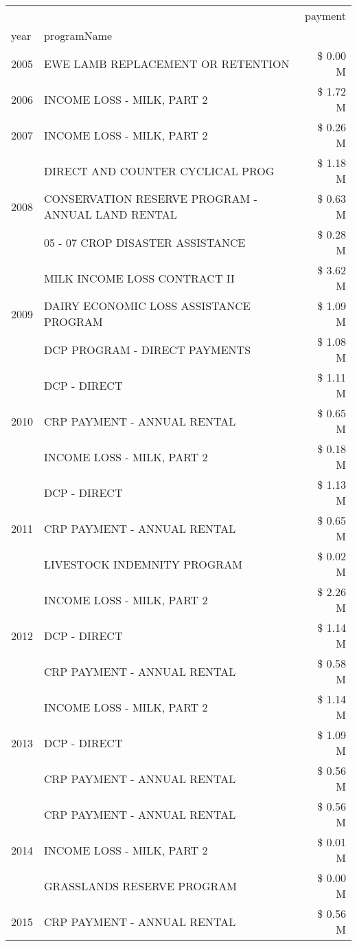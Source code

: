 \begin{tabular}{llr}
\toprule
 &  & payment \\
year & programName &  \\
\midrule
2005 & EWE LAMB REPLACEMENT OR RETENTION & \$ 0.00 M \\
\cline{1-3}
2006 & INCOME LOSS - MILK, PART 2 & \$ 1.72 M \\
\cline{1-3}
2007 & INCOME LOSS - MILK, PART 2 & \$ 0.26 M \\
\cline{1-3}
\multirow[t]{3}{*}{2008} & DIRECT AND COUNTER CYCLICAL PROG & \$ 1.18 M \\
 & CONSERVATION RESERVE PROGRAM - ANNUAL LAND RENTAL & \$ 0.63 M \\
 & 05 - 07 CROP DISASTER ASSISTANCE & \$ 0.28 M \\
\cline{1-3}
\multirow[t]{3}{*}{2009} & MILK INCOME LOSS CONTRACT II & \$ 3.62 M \\
 & DAIRY ECONOMIC LOSS ASSISTANCE PROGRAM & \$ 1.09 M \\
 & DCP PROGRAM - DIRECT PAYMENTS & \$ 1.08 M \\
\cline{1-3}
\multirow[t]{3}{*}{2010} & DCP - DIRECT & \$ 1.11 M \\
 & CRP PAYMENT - ANNUAL RENTAL & \$ 0.65 M \\
 & INCOME LOSS - MILK, PART 2 & \$ 0.18 M \\
\cline{1-3}
\multirow[t]{3}{*}{2011} & DCP - DIRECT & \$ 1.13 M \\
 & CRP PAYMENT - ANNUAL RENTAL & \$ 0.65 M \\
 & LIVESTOCK INDEMNITY PROGRAM & \$ 0.02 M \\
\cline{1-3}
\multirow[t]{3}{*}{2012} & INCOME LOSS - MILK, PART 2 & \$ 2.26 M \\
 & DCP - DIRECT & \$ 1.14 M \\
 & CRP PAYMENT - ANNUAL RENTAL & \$ 0.58 M \\
\cline{1-3}
\multirow[t]{3}{*}{2013} & INCOME LOSS - MILK, PART 2 & \$ 1.14 M \\
 & DCP - DIRECT & \$ 1.09 M \\
 & CRP PAYMENT - ANNUAL RENTAL & \$ 0.56 M \\
\cline{1-3}
\multirow[t]{3}{*}{2014} & CRP PAYMENT - ANNUAL RENTAL & \$ 0.56 M \\
 & INCOME LOSS - MILK, PART 2 & \$ 0.01 M \\
 & GRASSLANDS RESERVE PROGRAM & \$ 0.00 M \\
\cline{1-3}
\multirow[t]{3}{*}{2015} & CRP PAYMENT - ANNUAL RENTAL & \$ 0.56 M \\

\end{tabular}
